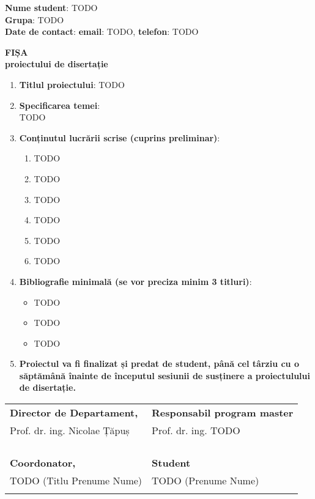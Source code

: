 \documentclass[12pt]{cse-form}
\begin{document}
\textbf{Nume student}: TODO \\
\textbf{Grupa}: TODO \\
\textbf{Date de contact}: \textbf{email}: TODO, \textbf{telefon}: TODO

\vspace{7mm}

\begin{center}
  \large{\textbf{FIȘA\\
  proiectului de disertație}}
\end{center}

\vspace{7mm}

\begin{enumerate}
  \item \textbf{Titlul proiectului}: TODO
  \item \textbf{Specificarea temei}:\\
    TODO
  \item \textbf{Conținutul lucrării scrise (cuprins preliminar)}:
    \begin{enumerate}
      \item TODO
      \item TODO
      \item TODO
      \item TODO
      \item TODO
      \item TODO
    \end{enumerate}
  \item \textbf{Bibliografie minimală (se vor preciza minim 3 titluri)}:
    \begin{itemize}
      \item TODO
      \item TODO
      \item TODO
    \end{itemize}
  \item \textbf{Proiectul va fi finalizat și predat de student, până cel
      târziu cu o săptămână înainte de începutul sesiunii de susținere a
    proiectulului de disertație.}
\end{enumerate}

\vspace{10mm}

\begin{center}
  \begin{tabular}{@{}p{}p{}@{}}
    \textbf{Director de Departament,} & \textbf{Responsabil program master} \\
    Prof. dr. ing. Nicolae Țăpuș & Prof. dr. ing. TODO \\
    & \\
    & \\
    & \\
    & \\
    \textbf{Coordonator,} & \textbf{Student} \\
    TODO (Titlu Prenume Nume) & TODO (Prenume Nume) \\
    & \\
  \end{tabular}
\end{center}
\end{document}
